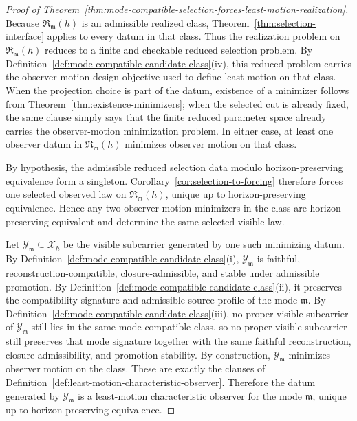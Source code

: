 \begin{proof}[Proof of Theorem~\ref{thm:mode-compatible-selection-forces-least-motion-realization}]
\label{proof:thm:mode-compatible-selection-forces-least-motion-realization}
Because \(\mathfrak R_{\mathfrak m}(h)\) is an admissible realized class,
Theorem~\ref{thm:selection-interface} applies to every datum in that class.
Thus the realization problem on \(\mathfrak R_{\mathfrak m}(h)\) reduces to a
finite and checkable reduced selection problem. By
Definition~\ref{def:mode-compatible-candidate-class}(iv), this reduced problem
carries the observer-motion design objective used to define least motion on
that class. When the projection choice is part of the datum, existence of a
minimizer follows from Theorem~\ref{thm:existence-minimizers}; when the
selected cut is already fixed, the same clause simply says that the finite
reduced parameter space already carries the observer-motion minimization
problem. In either case, at least one observer datum in
\(\mathfrak R_{\mathfrak m}(h)\) minimizes observer motion on that class.

By hypothesis, the admissible reduced selection data modulo horizon-preserving
equivalence form a singleton. Corollary~\ref{cor:selection-to-forcing}
therefore forces one selected observed law on
\(\mathfrak R_{\mathfrak m}(h)\), unique up to horizon-preserving equivalence.
Hence any two observer-motion minimizers in the class are
horizon-preserving equivalent and determine the same selected visible law.

Let \(\mathcal Y_{\mathfrak m}\subseteq \mathcal X_h\) be the visible
subcarrier generated by one such minimizing datum. By
Definition~\ref{def:mode-compatible-candidate-class}(i),
\(\mathcal Y_{\mathfrak m}\) is faithful, reconstruction-compatible,
closure-admissible, and stable under admissible promotion. By
Definition~\ref{def:mode-compatible-candidate-class}(ii), it preserves the
compatibility signature and admissible source profile of the mode
\(\mathfrak m\). By
Definition~\ref{def:mode-compatible-candidate-class}(iii), no proper visible
subcarrier of \(\mathcal Y_{\mathfrak m}\) still lies in the same
mode-compatible class, so no proper visible subcarrier still preserves that
mode signature together with the same faithful reconstruction,
closure-admissibility, and promotion stability. By construction,
\(\mathcal Y_{\mathfrak m}\) minimizes observer motion on the class. These are
exactly the clauses of Definition~\ref{def:least-motion-characteristic-observer}.
Therefore the datum generated by \(\mathcal Y_{\mathfrak m}\) is a
least-motion characteristic observer for the mode \(\mathfrak m\), unique up
to horizon-preserving equivalence.
\end{proof}

